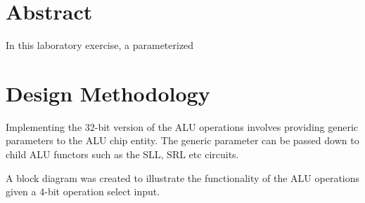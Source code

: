 \documentclass[CMPE]{../KGCOEReport}
\begin{document}
    \maketitle
    \section*{Abstract}

    In this laboratory exercise, a parameterized 

    \section*{Design Methodology}
    Implementing the 32-bit version of the ALU operations involves providing generic parameters
    to the ALU chip entity.
    The generic parameter can be passed down to child ALU functors such as the SLL, SRL etc circuits.

    A block diagram was created to illustrate the functionality of the ALU operations given a 4-bit operation
    select input.
\end{document}
